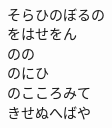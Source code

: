 \documentclass[10pt,b5j]{tarticle} %
\begin{document}
\begin{enumerate}
\begin{minipage}[c]{\blocksize}
        \vspace{\linespace}
        \item~\\
        そらひのぼるの\\
        をはせをん\\
        のの\\
        のにひ\\
        のこころみて\\
        きせぬへばや
    
    \end{minipage}
\end{enumerate} %
\end{document}
